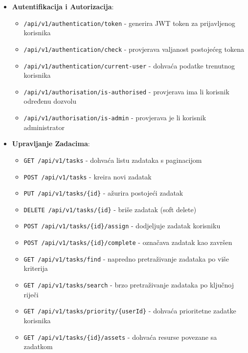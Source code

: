 \documentclass[a4paper,12pt]{article}
\begin{document}
\begin{itemize}
    \item \textbf{Autentifikacija i Autorizacija}:
        \begin{itemize}
            \item \texttt{/api/v1/authentication/token} - generira JWT token za prijavljenog korisnika
            \item \texttt{/api/v1/authentication/check} - provjerava valjanost postojećeg tokena
            \item \texttt{/api/v1/authentication/current-user} - dohvaća podatke trenutnog korisnika
            \item \texttt{/api/v1/authorisation/is-authorised} - provjerava ima li korisnik određenu dozvolu
            \item \texttt{/api/v1/authorisation/is-admin} - provjerava je li korisnik administrator
        \end{itemize}
    
    \item \textbf{Upravljanje Zadacima}:
        \begin{itemize}
            \item \texttt{GET /api/v1/tasks} - dohvaća listu zadataka s paginacijom
            \item \texttt{POST /api/v1/tasks} - kreira novi zadatak
            \item \texttt{PUT /api/v1/tasks/\{id\}} - ažurira postojeći zadatak
            \item \texttt{DELETE /api/v1/tasks/\{id\}} - briše zadatak (soft delete)
            \item \texttt{POST /api/v1/tasks/\{id\}/assign} - dodjeljuje zadatak korisniku
            \item \texttt{POST /api/v1/tasks/\{id\}/complete} - označava zadatak kao završen
            \item \texttt{GET /api/v1/tasks/find} - napredno pretraživanje zadataka po više kriterija
            \item \texttt{GET /api/v1/tasks/search} - brzo pretraživanje zadataka po ključnoj riječi
            \item \texttt{GET /api/v1/tasks/priority/\{userId\}} - dohvaća prioritetne zadatke korisnika
            \item \texttt{GET /api/v1/tasks/\{id\}/assets} - dohvaća resurse povezane sa zadatkom
        \end{itemize}
    

\end{itemize}
\end{document}
